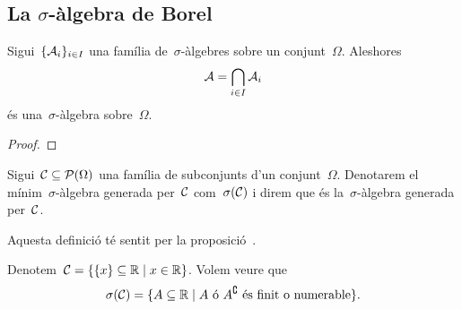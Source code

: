 \documentclass[../Apunts.tex]{subfiles}
\begin{document}
\subsection{La \ensuremath{\sigma}-àlgebra de Borel}
	\begin{proposition}
		\label{prop:existeix una sigma àlgebra mínima}
		Sigui~\(\{\mathcal{A}_{i}\}_{i\in I}\) una família de~\(\sigma\)-àlgebres sobre un conjunt~\(\Omega\). Aleshores
		\[\mathcal{A}=\bigcap_{i\in I}\mathcal{A}_{i}\]
		és una~\(\sigma\)-àlgebra sobre~\(\Omega\).
		\begin{proof}
		\end{proof}
	\end{proposition}
	\begin{definition}
		\label{def:sigma àlgebra generada per un conjunt}
		Sigui~\(\mathcal{C}\subseteq\operatorname{\mathcal{P}}(\Omega)\) una família de subconjunts d'un conjunt~\(\Omega\). Denotarem el mínim~\(\sigma\)-àlgebra generada per~\(\mathcal{C}\) com~\(\sigma(\mathcal{C})\) i direm que és la~\(\sigma\)-àlgebra generada per~\(\mathcal{C}\).
		
		Aquesta definició té sentit per la proposició~.
	\end{definition}
	\begin{example}
		\label{ex:sigma àlgebra de singletons}
		Denotem~\(\mathcal{C}=\{\{x\}\subseteq\mathbb{R}\mid x\in\mathbb{R}\}\). Volem veure que
		\[\sigma(\mathcal{C})=\{A\subseteq\mathbb{R}\mid A\text{ ó }A^{\complement}\text{ és finit o numerable}\}.\] %
		\begin{solution}
		\end{solution}
	\end{example}
\end{document}
